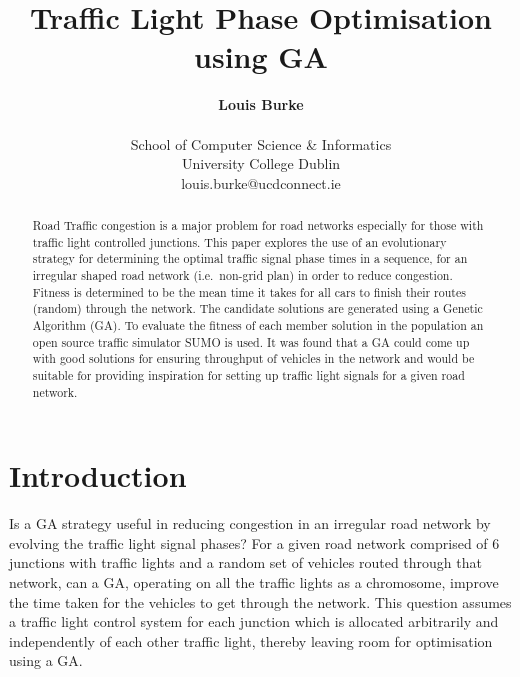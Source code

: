 \documentclass[a4paper,10pt]{article}
\begin{document}
\title{\bf Traffic Light Phase Optimisation using GA}
\author{{\bf Louis Burke}\\ \\
School of Computer Science \& Informatics\\
University College Dublin\\
louis.burke@ucdconnect.ie}
\maketitle

\begin{abstract}
Road Traffic congestion is a major problem for road networks especially for those with traffic light controlled junctions. This paper 
explores the use of an evolutionary strategy for determining the optimal traffic signal phase times in a sequence, for an irregular 
shaped road network (i.e.\ non-grid plan) in order to reduce congestion. Fitness is determined to be the mean time it takes for all cars 
to finish their routes (random) through the network. The candidate solutions are generated using a Genetic Algorithm (GA). To evaluate 
the fitness of each member solution in the population an open source traffic simulator SUMO \cite{SUMO} is used. It was found that a
GA could come up with good solutions for ensuring throughput of vehicles in the network and would be suitable for providing inspiration
for setting up traffic light signals for a given road network.

\end{abstract}

\section{Introduction}
Is a GA strategy useful in reducing congestion in an irregular road network by evolving the traffic light signal phases?
For a given road network comprised of 6 junctions with traffic lights and a random set of vehicles routed through 
that network, can a GA, operating on all the traffic lights as a chromosome, improve the time taken for the vehicles
 to get through the network. This question assumes a traffic light control system for each junction which is allocated
 arbitrarily and independently of each other traffic light, thereby leaving room for optimisation using a GA.
\end{document}
